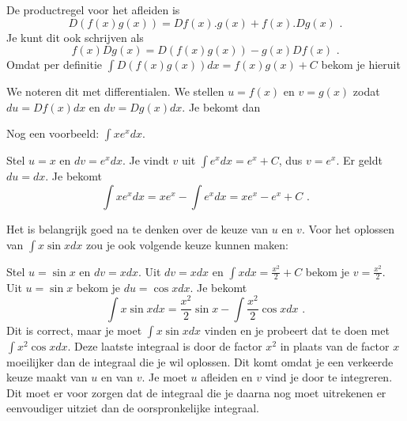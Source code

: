 De productregel voor het afleiden is
\[
D(f(x)g(x))=Df(x).g(x)+f(x).Dg(x) \text { .}
\]
Je kunt dit ook schrijven als
\[
f(x)Dg(x)=D(f(x)g(x))-g(x)Df(x) \text { .}
\]
Omdat per definitie $\int D(f(x)g(x))dx = f(x)g(x)+C$ bekom je hieruit \vspace{5mm}

\fbox{
	\begin{minipage}{8 cm}
		\[
		\int f(x)Dg(x)dx=f(x)g(x)-\int g(x)Df(x)dx
		\]
\end{minipage}}\vspace{0,5 cm}

We noteren dit met differentialen.
We stellen $u=f(x)$ en $v=g(x)$ zodat $du=Df(x)dx$ en $dv=Dg(x)dx$.
Je bekomt dan \vspace{5mm}

\fbox{
	\begin{minipage}{5 cm}
		\[
		\int udv=uv-\int vdu
		\]
\end{minipage}}\vspace{0,5 cm}

%
%
\vspace{2mm}

\begin{voorbeeld}
	\noindent Nog een voorbeeld: $\int x e^x dx$.

Stel $u=x$ en $dv=e^xdx$.
Je vindt $v$ uit $\int e^xdx=e^x+C$, dus $v=e^x$.
Er geldt $du=dx$.
Je bekomt
\[
\int xe^xdx=xe^x-\int e^xdx=xe^x-e^x+C \text { .}
\]
\vspace{2mm}

Het is belangrijk goed na te denken over de keuze van $u$ en $v$. Voor het oplossen van $\int x \sin x dx$ zou je ook volgende keuze kunnen maken:

Stel $u=\sin x$ en $dv=xdx$.
Uit $dv=xdx$ en $\int xdx = \frac{x^2}{2}+C$ bekom je $v=\frac{x^2}{2}$.
Uit $u=\sin x$ bekom je $du=\cos x dx$.
Je bekomt
\[
\int x \sin x dx=\frac{x^2}{2} \sin x-\int \frac{x^2}{2} \cos x dx \text { .}
\]
Dit is correct, maar je moet $\int x \sin x dx$ vinden en je probeert dat te doen met $\int x^2 \cos xdx$.
Deze laatste integraal is door de factor $x^2$ in plaats van de factor $x$ moeilijker dan de integraal die je wil oplossen.
Dit komt omdat je een verkeerde keuze maakt van $u$ en van $v$.
Je  moet $u$ afleiden en $v$ vind je door te integreren.
Dit moet er voor zorgen dat de integraal die je daarna nog moet uitrekenen er eenvoudiger uitziet dan de oorspronkelijke integraal.\\
\end{voorbeeld}

